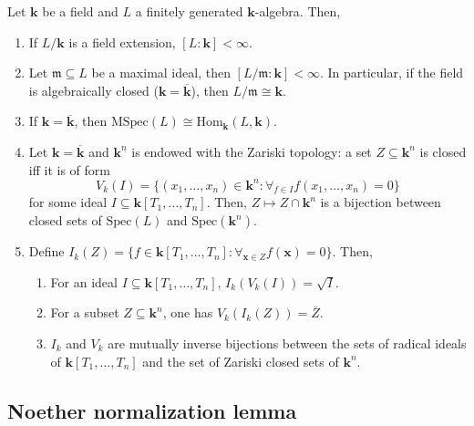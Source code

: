 \documentclass{template}
\begin{document}
\begin{lemma}
    Let $\mathbf{k}$ be a field and $L$ a finitely generated
    $\mathbf{k}$-algebra. Then,
    \begin{enumerate}
        \item[(i)] If $L/\mathbf{k}$ is a field extension, $[L:\mathbf{k}]<\infty$. 
        \item[(ii)] Let $\mathfrak{m} \subseteq L$ be a maximal ideal, then
        $[L/\mathfrak{m}: \mathbf{k}]<\infty$. In particular, if the field is
        algebraically closed ($\mathbf{k} = \overline{\mathbf{k}}$), then
        $L/\mathfrak{m} \cong \mathbf{k}$.
        \item[(iii)] If $\mathbf{k}=\overline{\mathbf{k}}$, then
        $\text{MSpec}(L) \cong \text{Hom}_{\mathbf{k}}(L,\mathbf{k})$.
        \item[(iv)] Let $\mathbf{k} = \overline{\mathbf{k}}$ and 
        $\mathbf{k}^n$ is endowed with the Zariski topology: a set 
        $Z \subseteq \mathbf{k}^n$ is closed iff it is of form
        \begin{equation*}
            V_k(I) = \{(x_1,\dots,x_n) \in \mathbf{k}^n: \forall_{f \in I} f(x_1,\dots,x_n) = 0\}
        \end{equation*}
        for some ideal $I \subseteq \mathbf{k}[T_1,\dots,T_n]$. Then, $Z \mapsto
        Z \cap \mathbf{k}^n$ is a bijection between closed sets of
        $\text{Spec}(L)$ and $\text{Spec}(\mathbf{k}^n)$.
        \item[(v)] Define $I_k(Z)=\{f \in \mathbf{k}[T_1,\dots,T_n]:
        \forall_{\mathbf{x} \in Z} f(\mathbf{x})=0\}$. Then,
        \begin{enumerate}
            \item[(a)] For an ideal $I \subseteq \mathbf{k}[T_1,\dots,T_n]$, $I_k(V_k(I)) = \sqrt{I}$.
            \item[(b)] For a subset $Z \subseteq \mathbf{k}^n$, one has $V_k(I_k(Z)) = \overline{Z}$.
            \item[(c)] $I_k$ and $V_k$ are mutually inverse bijections between
            the sets of radical ideals of $\mathbf{k}[T_1,\dots,T_n]$ and the
            set of Zariski closed sets of $\mathbf{k}^n$.  
        \end{enumerate}
    \end{enumerate}
\end{lemma}

\subsection{Noether normalization lemma}
\end{document}
